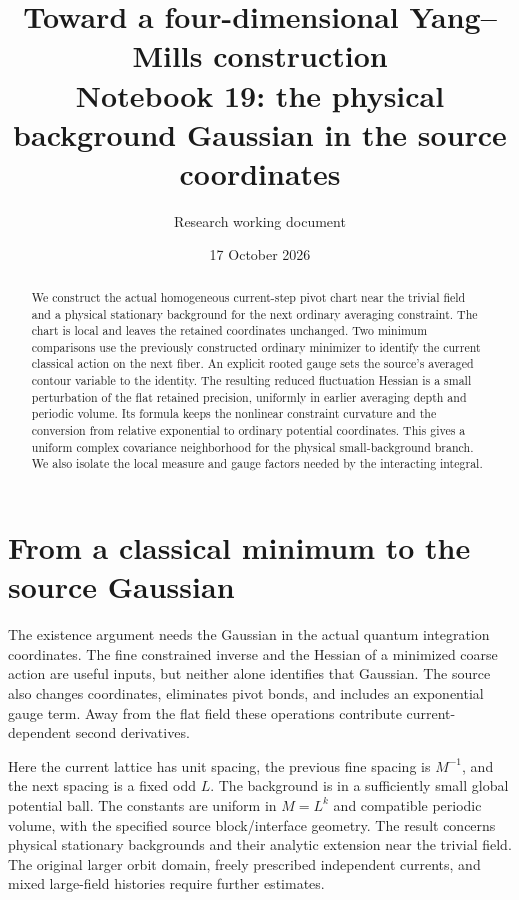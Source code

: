 \documentclass[11pt]{article}
\title{Toward a four-dimensional Yang--Mills construction\\
\large Notebook 19: the physical background Gaussian in the source coordinates}
\author{Research working document}
\date{17 October 2026}
\theoremstyle{remark}
\begin{document}
\maketitle
\begin{abstract}
We construct the actual homogeneous current-step pivot chart near
the trivial field and a physical stationary background for the
next ordinary averaging constraint. The chart is local and leaves
the retained coordinates unchanged. Two minimum comparisons use
the previously constructed ordinary minimizer to identify the
current classical action on the next fiber. An explicit rooted
gauge sets the source's averaged contour variable to the identity.
The resulting reduced fluctuation Hessian is a small perturbation
of the flat retained precision, uniformly in earlier averaging
depth and periodic volume. Its formula keeps the nonlinear
constraint curvature and the conversion from relative exponential
to ordinary potential coordinates. This gives a uniform complex
covariance neighborhood for the physical small-background branch.
We also isolate the local measure and gauge factors needed by
the interacting integral.
\end{abstract}

\section{From a classical minimum to the source Gaussian}
\label{ps19-target}

The existence argument needs the Gaussian in the actual quantum
integration coordinates. The fine constrained inverse and the
Hessian of a minimized coarse action are useful inputs, but
neither alone identifies that Gaussian. The source also changes
coordinates, eliminates pivot bonds, and includes an exponential
gauge term. Away from the flat field these operations contribute
current-dependent second derivatives.

Here the current lattice has unit spacing, the previous fine
spacing is $M^{-1}$, and the next spacing is a fixed odd $L$.
The background is in a sufficiently small global potential ball.
The constants are uniform in $M=L^k$ and compatible periodic
volume, with the specified source block/interface geometry.
The result concerns physical stationary backgrounds and their
analytic extension near the trivial field. The original larger
orbit domain, freely prescribed independent currents, and mixed
large-field histories require further estimates.
\end{document}
